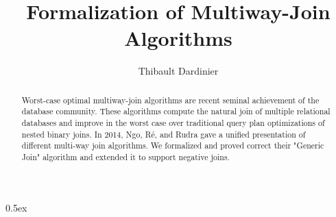 \documentclass[10pt,a4paper]{article}
\begin{document}
\title{Formalization of Multiway-Join Algorithms}
\author{Thibault Dardinier}

\maketitle

\begin{abstract}
Worst-case optimal multiway-join algorithms are recent seminal achievement of the database community.
These algorithms compute the natural join of multiple relational databases and improve in the worst case over traditional query plan optimizations of nested binary joins.
In 2014, Ngo, R\'e, and Rudra \cite{Ngo:2014:SSB:2590989.2590991} gave a unified presentation of different multi-way join algorithms.
We formalized and proved correct their "Generic Join" algorithm and extended it to support negative joins.
\end{abstract}

\tableofcontents

\parindent 0pt\parskip 0.5ex





\end{document}
